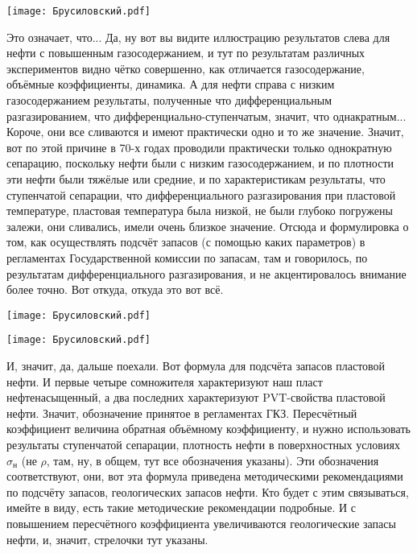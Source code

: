 \documentclass[main.tex]{subfiles}
\begin{document}
\begin{center}
\texttt{[image: Брусиловский.pdf]}
\end{center}

Это означает, что...
Да, ну вот вы видите иллюстрацию результатов слева для нефти с повышенным газосодержанием, и тут по результатам различных экспериментов видно чётко совершенно, как отличается газосодержание, объёмные коэффициенты, динамика.
А для нефти справа с низким газосодержанием результаты, полученные что дифференциальным разгазированием, что дифференциально-ступенчатым, значит, что однакратным...
Короче, они все сливаются и имеют практически одно и то же значение.
Значит, вот по этой причине в 70-х годах проводили практически только однократную сепарацию, поскольку нефти были с низким газосодержанием, и по плотности эти нефти были тяжёлые или средние, и по характеристикам результаты, что ступенчатой сепарации, что дифференциального разгазирования при пластовой температуре, пластовая температура была низкой, не были глубоко погружены залежи, они сливались, имели очень близкое значение.
Отсюда и формулировка о том, как осуществлять подсчёт запасов (с помощью каких параметров) в регламентах Государственной комиссии по запасам, там и говорилось, по результатам дифференциального разгазирования, и не акцентировалось внимание более точно.
Вот откуда, откуда это вот всё.

\begin{center}
\texttt{[image: Брусиловский.pdf]}
\end{center}



\begin{center}
\texttt{[image: Брусиловский.pdf]}
\end{center}

И, значит, да, дальше поехали.
Вот формула для подсчёта запасов пластовой нефти.
И первые четыре сомножителя характеризуют наш пласт нефтенасыщенный, а два последних характеризуют PVT-свойства пластовой нефти.
Значит, обозначение принятое в регламентах ГКЗ.
Пересчётный коэффициент величина обратная объёмному коэффициенту, и нужно использовать результаты ступенчатой сепарации, плотность нефти в поверхностных условиях $\sigma_{\text{н}}$ (не $\rho$, там, ну, в общем, тут все обозначения указаны).
Эти обозначения соответствуют, они, вот эта формула приведена методическими рекомендациями по подсчёту запасов, геологических запасов нефти.
Кто будет с этим связываться, имейте в виду, есть такие методические рекомендации подробные.
И с повышением пересчётного коэффициента увеличиваются геологические запасы нефти, и, значит, стрелочки тут указаны.
\end{document}

